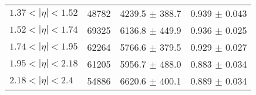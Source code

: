 \begin{tabular}{lccc}
$1.37 < |\eta| <1.52$          & 48782      & 4239.5     $\pm$ 388.7 & 0.939      $\pm$ 0.043 \\
$1.52 < |\eta| <1.74$          & 69325      & 6136.8     $\pm$ 449.9 & 0.936      $\pm$ 0.025 \\
$1.74 < |\eta| <1.95$          & 62264      & 5766.6     $\pm$ 379.5 & 0.929      $\pm$ 0.027 \\
$1.95 < |\eta| <2.18$          & 61205      & 5956.7     $\pm$ 488.0 & 0.883      $\pm$ 0.034 \\
$2.18 < |\eta| <2.4$           & 54886      & 6620.6     $\pm$ 400.1 & 0.889      $\pm$ 0.034 \\
\hline
\end{tabular}
